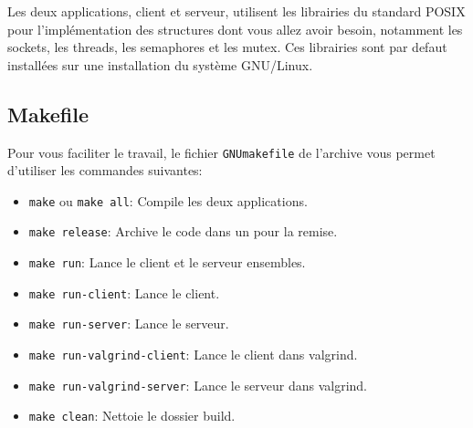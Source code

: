 \documentclass{article}
\begin{document}
Les deux applications, client et serveur, utilisent les librairies du
standard POSIX pour l’implémentation des structures dont vous allez avoir
besoin, notamment les sockets, les threads, les semaphores et les mutex.
Ces librairies sont par defaut installées sur une installation du système
GNU/Linux.

\subsection{Makefile}

Pour vous faciliter le travail, le fichier \texttt{GNUmakefile} de l'archive
vous permet d'utiliser les commandes suivantes:
\begin{itemize}
  \item \texttt{make} ou \texttt{make all}: Compile les deux applications.
  \item \texttt{make release}: Archive le code dans un  pour la remise.
  \item \texttt{make run}: Lance le client et le serveur ensembles.
  \item \texttt{make run-client}: Lance le client.
  \item \texttt{make run-server}: Lance le serveur.
  \item \texttt{make run-valgrind-client}: Lance le client dans valgrind.
  \item \texttt{make run-valgrind-server}: Lance le serveur dans valgrind.
  \item \texttt{make clean}: Nettoie le dossier build.
\end{itemize}
\end{document}
